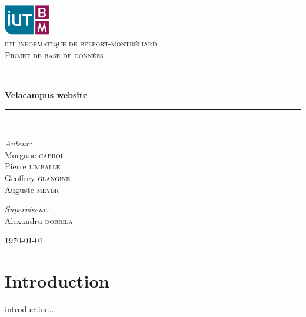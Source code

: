 \documentclass[11pt,a4paper,titlepage]{report}
\newcommand{\HRule}{\rule{\linewidth}{0.5mm}}
\begin{document}
\begin{titlepage}
\begin{center}

\includegraphics[width=0.15\textwidth]{logo.png}~
\\[1cm]
\textsc{\LARGE iut informatique de belfort-montbéliard}\\[1cm]

\textsc{\Large Projet de base de données}\\[0.5cm]

\HRule \\[0.4cm]
{ \huge \bfseries Velacampus website \\[0.4cm] }

\HRule \\[1.5cm]

\begin{minipage}{0.4\textwidth}
\begin{flushleft} \large
\emph{Auteur:}\\
Morgane \textsc{cabrol}\\
Pierre \textsc{limballe}\\
Geoffrey \textsc{glangine}\\
Auguste \textsc{meyer}
\end{flushleft}
\end{minipage}
\begin{minipage}{0.4\textwidth}
\begin{flushright} \large
\emph{Superviseur:} \\
Alexandru  \textsc{dobrila}
\end{flushright}
\end{minipage}

\vfill

{\large \today}

\end{center}
\end{titlepage}

\tableofcontents
\chapter*{Introduction}
introduction...
\end{document}

